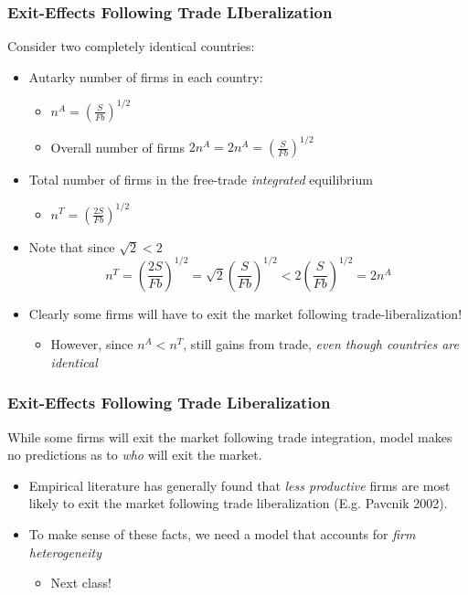 \documentclass{beamer}
\begin{document}
\begin{frame}
	\frametitle{Exit-Effects Following Trade LIberalization}	

Consider two completely identical countries:
	\begin{itemize}
		\item Autarky number of firms in each country:
		\begin{itemize}
			\item $n^A=\left(\frac{S}{Fb}\right)^{1/2}$
			\item Overall number of firms $2n^A=2n^A=\left(\frac{S}{Fb}\right)^{1/2}$
		\end{itemize}
		\item Total number of firms in the free-trade \emph{integrated} equilibrium
			\begin{itemize}
			\item $n^T=\left(\frac{2S}{Fb}\right)^{1/2}$
			\end{itemize}
		\item Note that since $\sqrt{2}<2$
			\scriptsize
			\begin{equation}
			n^T = \left(\frac{2S}{Fb}\right)^{1/2} = \sqrt{2}\left(\frac{S}{Fb}\right)^{1/2} < 2\left(\frac{S}{Fb}\right)^{1/2}  = 2n^A \nonumber
			\end{equation}
			\normalsize
		\item Clearly some firms will have to exit the market following trade-liberalization!
			\begin{itemize}
				\item However, since $n^A<n^T$, still gains from trade, \emph{even though countries are identical}
			\end{itemize}
	\end{itemize}
	
\end{frame}

\begin{frame}
	\frametitle{Exit-Effects Following Trade Liberalization}
While some firms will exit the market following trade integration, model makes no predictions as to \emph{who} will exit the market.
	\begin{itemize}
		\item Empirical literature has generally found that \emph{less productive} firms are most likely to exit the market following trade liberalization (E.g. Pavcnik 2002).
		\item To make sense of these facts, we need a model that accounts for \emph{firm heterogeneity}
			\begin{itemize}
				\item Next class!
			\end{itemize}
	\end{itemize}
\end{frame}
\end{document}
